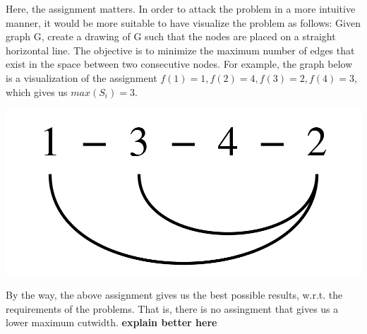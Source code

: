 Here, the assignment matters. In order to attack the problem in a more intuitive manner, it would be more suitable to have visualize the problem as follows: Given graph G, create a drawing of G such that the nodes are placed on a straight horizontal line.
The objective is to minimize the maximum number of edges that exist in the space between two consecutive nodes. 
For example, the graph below is a visualization of the assignment $f(1)=1, f(2)=4,f(3)=2,f(4)=3$, which gives us $max(S_i)=3$.

\begin{center}
\includegraphics[scale=0.1]{img/graph2.png}
\end{center}

By the way, the above assignment gives us the best possible results, w.r.t. the requirements of the problems. That is, there is no assingment that gives us a lower maximum cutwidth. \textbf{explain better here}


